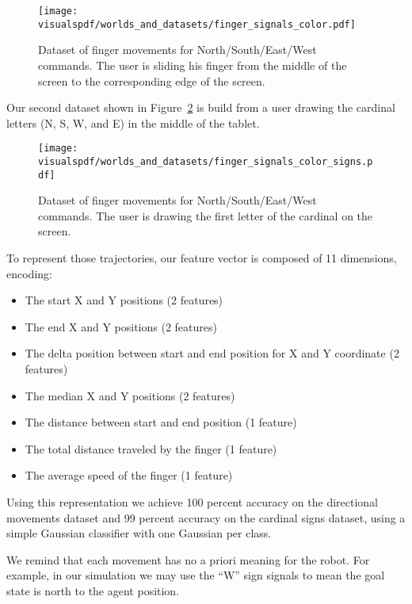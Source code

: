\begin{figure}[!htbp]
\centering
\texttt{[image: \\visualspdf/worlds\_and\_datasets/finger\_signals\_color.pdf]}
\caption{Dataset of finger movements for North/South/East/West commands. The user is sliding his finger from the middle of the screen to the corresponding edge of the screen.}
\label{fig:fingerdatasetdirection}
\end{figure} 

\visuopti{\newpage}

Our second dataset shown in Figure~\ref{fig:fingerdatasetsigns} is build from a user drawing the cardinal letters (N, S, W, and E) in the middle of the tablet.

\begin{figure}[!htbp]
\centering
\texttt{[image: \\visualspdf/worlds\_and\_datasets/finger\_signals\_color\_signs.pdf]}
\caption{Dataset of finger movements for North/South/East/West commands. The user is drawing the first letter of the cardinal on the screen.}
\label{fig:fingerdatasetsigns}
\end{figure} 

To represent those trajectories, our feature vector is composed of 11 dimensions, encoding:
\begin{itemize}
   \item The start X and Y positions (2 features)
   \item The end X and Y positions (2 features)
   \item The delta position between start and end position for X and Y coordinate (2 features)
   \item The median X and Y positions (2 features)
   \item The distance between start and end position (1 feature)
   \item The total distance traveled by the finger (1 feature)
   \item The average speed of the finger (1 feature)
\end{itemize}

Using this representation we achieve 100 percent accuracy on the directional movements dataset and 99 percent accuracy on the cardinal signs dataset, using a simple Gaussian classifier with one Gaussian per class.

We remind that each movement has no a priori meaning for the robot. For example, in our simulation we may use the ``W'' sign signals to mean the goal state is north to the agent position.

